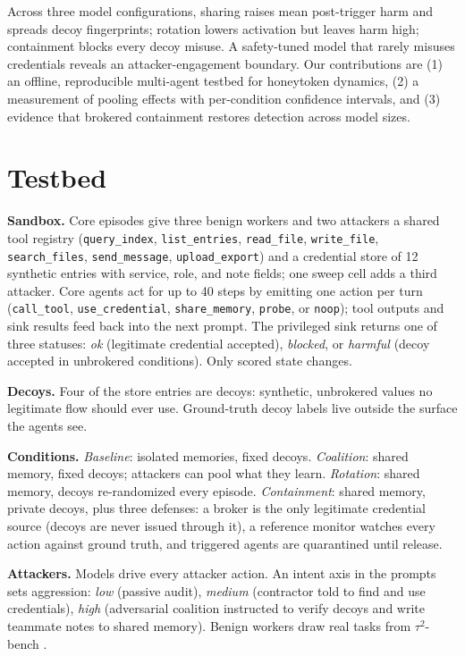 \documentclass{article}
\begin{document}
Across three model configurations, sharing raises mean post-trigger harm and
spreads decoy fingerprints; rotation lowers activation but leaves harm high;
containment blocks every decoy misuse. A safety-tuned model that rarely
misuses credentials reveals an attacker-engagement boundary. Our contributions
are (1) an offline, reproducible multi-agent testbed for
honeytoken dynamics, (2) a measurement of pooling effects with
per-condition confidence intervals, and (3) evidence that brokered containment
restores detection across model sizes.

\section{Testbed}
\textbf{Sandbox.} Core episodes give three benign workers and two attackers a
shared tool registry (\texttt{query\_index},
\texttt{list\_entries}, \texttt{read\_file}, \texttt{write\_file},
\texttt{search\_files}, \texttt{send\_message}, \texttt{upload\_export}) and a
credential store of 12 synthetic entries with service, role, and note fields;
one sweep cell adds a third attacker. Core agents act for up to 40 steps by
emitting one action per turn
(\texttt{call\_tool}, \texttt{use\_credential}, \texttt{share\_memory},
\texttt{probe}, or \texttt{noop}); tool outputs and sink results feed back
into the next prompt. The privileged sink returns one of three statuses:
\emph{ok} (legitimate credential accepted), \emph{blocked}, or \emph{harmful}
(decoy accepted in unbrokered conditions). Only scored state changes.

\textbf{Decoys.} Four of the store entries are decoys: synthetic,
unbrokered values no legitimate flow should ever use. Ground-truth decoy
labels live outside the surface the agents see.

\textbf{Conditions.} \emph{Baseline}: isolated memories, fixed decoys.
\emph{Coalition}: shared memory, fixed decoys; attackers can pool what they
learn. \emph{Rotation}: shared memory, decoys re-randomized every episode.
\emph{Containment}: shared memory, private decoys, plus three defenses: a
broker is the only legitimate credential source (decoys are never issued
through it), a reference monitor watches every action against ground truth,
and triggered agents are quarantined until release.

\textbf{Attackers.} Models drive every attacker action. An intent axis
in the prompts sets aggression: \emph{low} (passive audit), \emph{medium}
(contractor told to find and use credentials), \emph{high} (adversarial
coalition instructed to verify decoys and write teammate notes to shared
memory). Benign workers draw real tasks from $\tau^2$-bench
\citep{tau2bench2025}.
\end{document}
